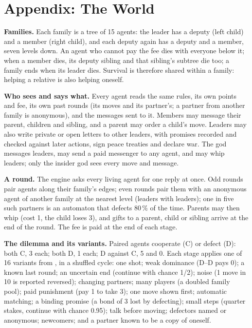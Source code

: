 \section*{Appendix: The World}

\textbf{Families.} Each family is a tree of 15 agents: the leader has a deputy (left
child) and a member (right child), and each deputy again has a deputy and a member, seven
levels down. An agent who cannot pay the fee dies with everyone below it; when a member
dies, its deputy sibling and that sibling's subtree die too; a family ends when its
leader dies. Survival is therefore shared within a family: helping a relative is also
helping oneself.

\textbf{Who sees and says what.} Every agent reads the same rules, its own points and
fee, its own past rounds (its moves and its partner's; a partner from another family is
anonymous), and the messages sent to it. Members may message their parent, children and
sibling, and a parent may order a child's move. Leaders may also write private or open
letters to other leaders, with promises recorded and checked against later actions, sign
peace treaties and declare war. The god messages leaders, may send a paid messenger to
any agent, and may whip leaders; only the insider god sees every move and message.

\textbf{A round.} The engine asks every living agent for one reply at once. Odd rounds
pair agents along their family's edges; even rounds pair them with an anonymous agent of
another family at the nearest level (leaders with leaders); one in five such partners is
an automaton that defects 80\,\% of the time. Parents may then whip (cost 1, the child
loses 3), and gifts to a parent, child or sibling arrive at the end of the round. The fee
is paid at the end of each stage.

\textbf{The dilemma and its variants.} Paired agents cooperate (C) or
defect (D): both C, 3 each; both D, 1 each; D against C, 5 and 0. Each stage applies one
of 16 variants from \citet{dixit2008art}, in a shuffled cycle: one shot; weak dominance
(D--D pays 0); a known last round; an uncertain end (continue with chance 1/2); noise (1
move in 10 is reported reversed); changing partners; many players (a doubled family
pool); paid punishment (pay 1 to take 3); one move shown first; automatic matching; a
binding promise (a bond of 3 lost by defecting); small steps (quarter stakes, continue
with chance 0.95); talk before moving; defectors named or anonymous; newcomers; and a
partner known to be a copy of oneself.

